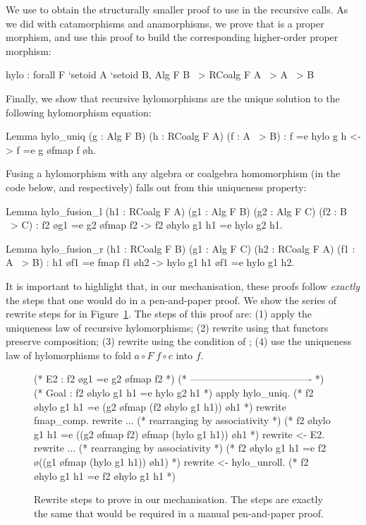 \documentclass[a4paper,UKenglish,cleveref, autoref, thm-restate]{lipics-v2021}
\begin{document}
\noindent
We use  to obtain the structurally smaller proof to use in
the recursive calls.
As we did with catamorphisms and anamorphisms, we
prove that  is a proper morphism, and use this proof to build the
corresponding higher-order proper morphism:
\begin{coqcode}
hylo : forall F `{setoid A} `{setoid B}, Alg F B ~> RCoalg F A ~> A ~> B
\end{coqcode}
Finally, we show that recursive hylomorphisms are the unique solution to the following
hylomorphism equation:
\begin{coqcode}
Lemma hylo_uniq (g : Alg F B) (h : RCoalg F A) (f : A ~> B)
    : f =e hylo g h <-> f =e g \o fmap f \o h.
\end{coqcode}
Fusing a hylomorphism with any algebra or coalgebra homomorphism (in the code
below,  and  respectively) falls out from this uniqueness
property:
\begin{coqcode}
Lemma hylo_fusion_l (h1 : RCoalg F A) (g1 : Alg F B) (g2 : Alg F C) (f2 : B ~> C)
  : f2 \o g1 =e g2 \o fmap f2 -> f2 \o hylo g1 h1 =e hylo g2 h1.

Lemma hylo_fusion_r (h1 : RCoalg F B) (g1 : Alg F C) (h2 : RCoalg F A) (f1 : A ~> B)
  :  h1 \o f1 =e fmap f1 \o h2 -> hylo g1 h1 \o f1 =e hylo g1 h2.
\end{coqcode}

\noindent
It is important to highlight that, in our mechanisation, these proofs follow
\emph{exactly} the steps that one would do in a pen-and-paper proof.  We show
the series of rewrite steps for  in
Figure~\ref{fig:proof-fusion-l}. The steps of this proof are: (1) apply the
uniqueness law of recursive hylomorphisms; (2) rewrite using that
functors preserve composition; (3) rewrite using the
condition of ; (4) use the uniqueness law of hylomorphisms to
fold $a \circ F \; f \circ c$ into $f$.
\begin{figure}[t!]
\begin{coqcode}
(* E2 : f2 \o g1 =e g2 \o fmap f2 *)
(* ------------------------------------- *)
(* Goal : f2 \o hylo g1 h1 =e hylo g2 h1 *)
apply hylo_uniq.
       (* f2 \o hylo g1 h1 =e (g2 \o fmap (f2 \o hylo g1 h1)) \o h1        *)
rewrite fmap_comp.
rewrite ... (* rearranging by associativity *)
       (* f2 \o hylo g1 h1 =e ((g2 \o fmap f2) \o fmap (hylo g1 h1)) \o h1 *)
rewrite <- E2.
rewrite ... (* rearranging by associativity *)
       (* f2 \o hylo g1 h1 =e f2 \o ((g1 \o fmap (hylo g1 h1)) \o h1)      *)
rewrite <- hylo_unroll.
       (* f2 \o hylo g1 h1 =e f2 \o hylo g1 h1                             *)
\end{coqcode}

  \vspace{-.5cm}
  \caption{Rewrite steps to prove  in our mechanisation. The
steps are exactly the same that would be required in a manual pen-and-paper
proof.}
\label{fig:proof-fusion-l}
\end{figure}
\end{document}
